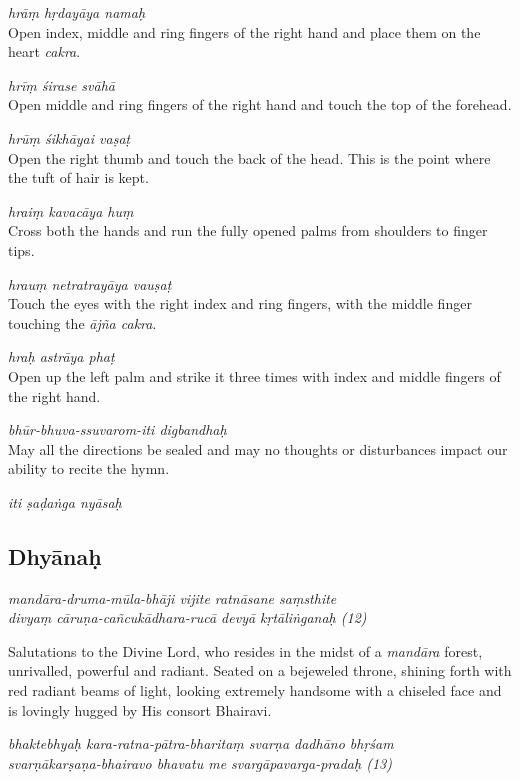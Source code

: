 \documentclass[11pt,oneside,a4paper]{article}
\newenvironment{shloka}[1]
  {\bigskip\center#1\varwidth{\linewidth}}
  {\endvarwidth\endcenter\bigskip}
\newcommand{\tl}[1]{\emph{#1}}
\begin{document}
\tl{hrāṃ hṛdayāya namaḥ}\\
Open index, middle and ring fingers of the right hand and place them on
the heart \tl{cakra}.

\tl{hrīṃ śirase svāhā}\\
Open middle and ring fingers of the right hand and touch the top of
the forehead.

\tl{hrūṃ śikhāyai vaṣaṭ}\\
Open the right thumb and touch the back of the head. This is the point where
the tuft of hair is kept.

\tl{hraiṃ kavacāya huṃ}\\
Cross both the hands and run the fully opened palms from shoulders to
finger tips.

\tl{hrauṃ netratrayāya vauṣaṭ}\\
Touch the eyes with the right index and ring fingers, with the middle finger
touching the \tl{ājña cakra}.

\tl{hraḥ astrāya phaṭ}\\
Open up the left palm and strike it three times with index and middle fingers
of the right hand.

\tl{bhūr-bhuva-ssuvarom-iti digbandhaḥ}\\
May all the directions be sealed and may no thoughts or disturbances impact our
ability to recite the hymn.

\begin{shloka}\itshape
  iti ṣaḍaṅga nyāsaḥ
\end{shloka}

\subsection{Dhyānaḥ}

\begin{shloka}\itshape
  mandāra-druma-mūla-bhāji vijite ratnāsane saṃsthite\\
  divyaṃ cāruṇa-cañcukādhara-rucā devyā kṛtāliṅganaḥ (12)
\end{shloka}

Salutations to the Divine Lord, who resides in the midst of a \tl{mandāra}
forest, unrivalled, powerful and radiant. Seated on a bejeweled throne, shining
forth with red radiant beams of light, looking extremely handsome with
a chiseled face and is lovingly hugged by His consort Bhairavi.

\begin{shloka}\itshape
  bhaktebhyaḥ kara-ratna-pātra-bharitaṃ svarṇa dadhāno bhṛśam\\
  svarṇākarṣaṇa-bhairavo bhavatu me svargāpavarga-pradaḥ (13)
\end{shloka}
\end{document}
